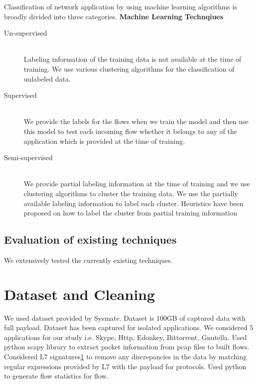 \documentclass[conference]{IEEEtran}
\begin{document}
Classification of network application by using machine learning algorithms is broadly divided into three categories. 
\textbf{Machine Learning Technqiues}
\begin{description}
	\item[Un-supervised] \hfill \\ Labeling information of the training data is not available at the time of training. We use various clustering algorithms for the classification of unlabeled data\cite{}.
	\item[Supervised] \hfill \\ We provide the labels for the flows when we train the model and then use this model to test each incoming flow whether it belongs to any of the application which is provided at the time of training\cite{}. 
	\item[Semi-supervised] \hfill \\ We provide partial labeling information at the time of training and we use clustering algorithms to cluster the training data. We use the partially available labeling information to label each cluster. Heuristics have been proposed on how to label the cluster from partial training information\cite{}
\end{description}

\subsection{Evaluation of existing techniques}
We extensively tested the currently existing techniques\cite{}. 

\section{Dataset and Cleaning}
We used dataset provided by Sysmate. Dataset is 100GB of captured data with full payload. Dataset has been captured for isolated applications. We considered 5 applications for our study i.e. Skype, Http, Edonkey, Bittorrent, Gnutella. Used python scapy library to extract packet information from pcap files to built flows. Considered L7 signatures\ref{} to remove any discrepancies in the data by matching regular expressions provided by L7 with the payload for protocols. Used python to generate flow statistics for flow. 
\end{document}
